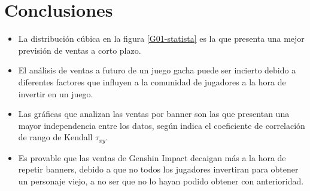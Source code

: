 \documentclass[osajnl,twocolumn,showpacs,superscriptaddress,10pt]{revtex4-2}
\begin{document}
\section{Conclusiones}
    \begin{itemize}
        \item La distribución cúbica en la figura \ref{G01-statista} es la que presenta una mejor previsión de ventas a corto plazo.
        \item El análisis de ventas a futuro de un juego gacha puede ser incierto debido a diferentes factores que influyen a la comunidad de jugadores a la hora de invertir en un juego.
        \item Las gráficas que analizan las ventas por banner son las que presentan una mayor independencia entre los datos, según indica el coeficiente de correlación de rango de Kendall $\tau_{xy}$.
        \item Es provable que las ventas de Genshin Impact decaigan más a la hora de repetir banners, debido a que no todos los jugadores invertiran para obtener un personaje viejo, a no ser que no lo hayan podido obtener con anterioridad.
    \end{itemize}

    \nocite{*}
    
\end{document}
